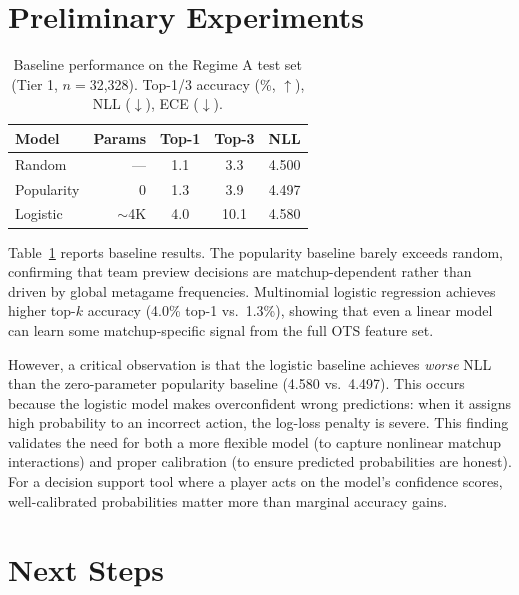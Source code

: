 \documentclass[11pt]{article}
\begin{document}
\section{Preliminary Experiments}
\label{sec:experiments}

\begin{table}[t]
\centering
\caption{Baseline performance on the Regime A test set (Tier 1, $n{=}$32,328). Top-1/3 accuracy (\%, $\uparrow$), NLL ($\downarrow$), ECE ($\downarrow$).}
\label{tab:baselines}
\small
\begin{tabular}{@{}lrccc@{}}
\toprule
\textbf{Model} & \textbf{Params} & \textbf{Top-1} & \textbf{Top-3} & \textbf{NLL} \\
\midrule
Random & --- & 1.1 & 3.3 & 4.500 \\
Popularity & 0 & 1.3 & 3.9 & 4.497 \\
Logistic & $\sim$4K & 4.0 & 10.1 & 4.580 \\
\bottomrule
\end{tabular}
\end{table}

Table~\ref{tab:baselines} reports baseline results.
The popularity baseline barely exceeds random, confirming that team preview decisions are matchup-dependent rather than driven by global metagame frequencies.
Multinomial logistic regression achieves higher top-$k$ accuracy (4.0\% top-1 vs.\ 1.3\%), showing that even a linear model can learn some matchup-specific signal from the full OTS feature set.

However, a critical observation is that the logistic baseline achieves \emph{worse} NLL than the zero-parameter popularity baseline (4.580 vs.\ 4.497).
This occurs because the logistic model makes overconfident wrong predictions: when it assigns high probability to an incorrect action, the log-loss penalty is severe.
This finding validates the need for both a more flexible model (to capture nonlinear matchup interactions) and proper calibration (to ensure predicted probabilities are honest).
For a decision support tool where a player acts on the model's confidence scores, well-calibrated probabilities matter more than marginal accuracy gains.


\section{Next Steps}
\label{sec:nextsteps}
\end{document}
